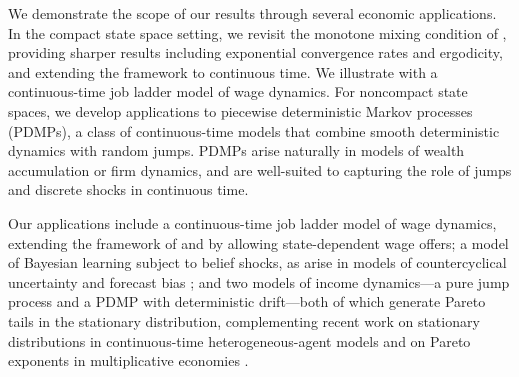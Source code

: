 \documentclass[12pt,reqno]{amsart}
\numberwithin{equation}{section}
\theoremstyle{definition}
\newcommand{\1}{\mathbbm{1}}
\begin{document}

We demonstrate the scope of our results through several economic applications.
In the compact state space setting, we revisit the monotone mixing condition of
\cite{hopenhayn1992stochastic}, providing sharper results including exponential
convergence rates and ergodicity, and extending the framework to continuous
time. We illustrate with a continuous-time job ladder model of wage dynamics.
For noncompact state spaces, we develop applications to piecewise deterministic
Markov processes (PDMPs), a class of continuous-time models that combine smooth
deterministic dynamics with random jumps. PDMPs arise naturally in models of
wealth accumulation or firm dynamics, and are well-suited to capturing
the role of jumps and discrete shocks in continuous time.  

Our applications include a continuous-time job ladder model of wage dynamics,
extending the framework of \cite{burdett1998wage} and
\cite{moscarini2013stochastic} by allowing state-dependent wage offers; a
model of Bayesian learning subject to belief shocks, as arise in models of
countercyclical uncertainty and forecast bias
\citep{orlik2014understanding, cogley2008drifting}; and two models of income
dynamics---a pure jump process and a PDMP with deterministic drift---both of
which generate Pareto tails in the stationary distribution, complementing
recent work on stationary distributions in continuous-time
heterogeneous-agent models \citep{gabaix2016dynamics} and on Pareto
exponents in multiplicative economies \citep{beare2022determination}.
\end{document}
